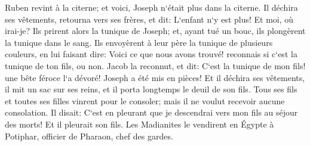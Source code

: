 \verse Ruben revint à la citerne; et voici, Joseph n`était plus dans la citerne. Il déchira ses vêtements, 
\verse retourna vers ses frères, et dit: L`enfant n`y est plus! Et moi, où irai-je? 
\verse Ils prirent alors la tunique de Joseph; et, ayant tué un bouc, ils plongèrent la tunique dans le sang. 
\verse Ils envoyèrent à leur père la tunique de plusieurs couleurs, en lui faisant dire: Voici ce que nous avons trouvé! reconnais si c`est la tunique de ton fils, ou non. 
\verse Jacob la reconnut, et dit: C`est la tunique de mon fils! une bête féroce l`a dévoré! Joseph a été mis en pièces! 
\verse Et il déchira ses vêtements, il mit un sac sur ses reins, et il porta longtemps le deuil de son fils. 
\verse Tous ses fils et toutes ses filles vinrent pour le consoler; mais il ne voulut recevoir aucune consolation. Il disait: C`est en pleurant que je descendrai vers mon fils au séjour des morts! Et il pleurait son fils. 
\verse Les Madianites le vendirent en Égypte à Potiphar, officier de Pharaon, chef des gardes. 

\chapter{}

